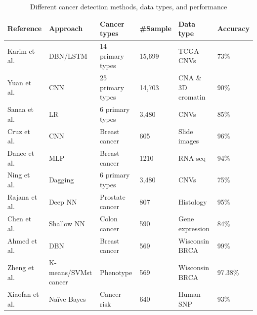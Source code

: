 \begin{table}[!ht]
    \caption{Different cancer detection methods, data types, and performance }
    \label{table:stateofart}
    \begin{center}
    \scriptsize
    \vspace{-6mm}
    \begin{tabular}{l|l|l|l|l|l}
        \hline
        \textbf{Reference} & \textbf{Approach} & \textbf{Cancer types} & \textbf{\#Sample} & \textbf{Data type} & \textbf{Accuracy} \\\hline
            Karim et al.~\cite{karim2018a2ic} & DBN/LSTM & 14 primary types & 15,699 & TCGA CNVs & 73\% \\\hline %
            Yuan et al.~\cite{yuan2018cancer} & CNN & 25 primary types & 14,703 & CNA \& 3D cromatin & 90\% \\\hline %
            Sanaa et al.~\cite{elsadek2018supervised} & LR & 6 primary types & 3,480  & CNVs & 85\% \\\hline %
        	Cruz et al.~\cite{19Cruz} & CNN & Breast cancer  & 605 & Slide images & 96\%  \\\hline  %
            Danee et al.~\cite{17Danaee} & MLP & Breast cancer & 1210 & RNA-seq & 94\% \\\hline %
            Ning et al.~\cite{zhang2016classification} & Dagging & 6 primary types & 3,480  & CNVs & 75\% \\\hline %
        	Rajana et al.~\cite{20Rajanna} & Deep NN & Prostate cancer & 807 & Histology & 95\%\\\hline
            Chen et al.~\cite{18Chen} & Shallow NN & Colon cancer  & 590 & Gene expression & 84\% \\ \hline %
            Ahmed et al.~\cite{abdel2016breast} & DBN & Breast cancer  & 569 & Wisconsin BRCA & 99\% \\ \hline %
            Zheng et al.~\cite{23Zheng} & K-means/SVMst cancer & Phenotype & 569 & Wisconsin BRCA & 97.38\% \\ \hline %
            Xiaofan et al.~\cite{ding2014application} & Naïve Bayes & Cancer risk & 640 & Human SNP & 93\% \\ \hline %
        \end{tabular}
        \vspace{-6mm}
    \end{center}
\end{table}

